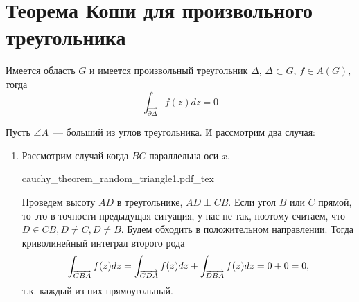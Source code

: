\documentclass[main]{subfiles}
\begin{document}
\section{Теорема Коши для произвольного треугольника}
\begin{theorem}
    Имеется область $G$ и имеется произвольный треугольник $\Delta$, $\Delta \subset G$, $f \in A(G)$, тогда
    \[\int_{\overrightarrow{\partial \Delta}} f(z) dz = 0\]
\end{theorem}
\begin{longProof}
    Пусть $\angle A$~--- больший из углов треугольника.
    И рассмотрим два случая:
    \begin{enumerate}
        \item Рассмотрим случай когда $BC$ параллельна оси $x$.
              \begin{center}
                  \def\svgwidth{0.45\linewidth}
                  {cauchy_theorem_random_triangle1.pdf_tex}
              \end{center}
              Проведем высоту $AD$ в треугольнике, $AD \perp CB$.
              Если угол $B$ или $C$ прямой, то это в точности предыдущая ситуация, у нас не так, поэтому считаем, что $D \in CB, D \neq C, D \neq B$.
              Будем обходить в положительном направлении.
              Тогда криволинейный интеграл второго рода
              \[\AnClOrInt[\AnClOrCurve[CBA]] f(z) dz = \AnClOrInt[\AnClOrCurve[CDA]] f(z) dz + \AnClOrInt[\AnClOrCurve[DBA]] f(z) dz = 0+ 0 = 0,\]
              т.к. каждый из них прямоугольный.


\end{enumerate}
\end{longProof}
\end{document}

